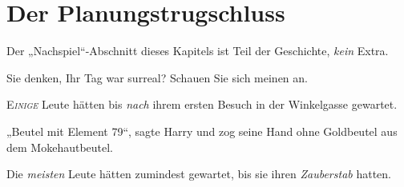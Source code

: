 \chapter{Der Planungstrugschluss}

\begin{chapterOpeningAuthorNote}
%
Der „Nachspiel“-Abschnitt dieses Kapitels ist Teil der Geschichte, \emph{kein} Extra.
\end{chapterOpeningAuthorNote}
\begin{chapterOpeningQuote}
Sie denken, Ihr Tag war surreal? Schauen Sie sich meinen an.
\end{chapterOpeningQuote}

\lettrine{E}{\emph{inige}} Leute hätten bis \emph{nach} ihrem ersten Besuch in der Winkelgasse gewartet.

„Beutel mit Element 79“, sagte Harry und zog seine Hand ohne Goldbeutel aus dem Mokehautbeutel.

Die \emph{meisten} Leute hätten zumindest gewartet, bis sie ihren \emph{Zauberstab} hatten.

